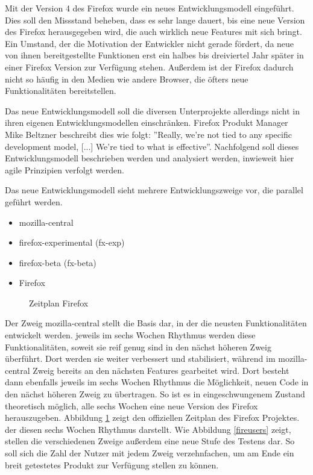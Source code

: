 Mit der Version 4 des Firefox wurde ein neues Entwicklungsmodell eingeführt. Dies soll den Missstand beheben, dass es sehr lange dauert, bis eine neue Version des Firefox herausgegeben wird, die auch wirklich neue Features mit sich bringt. Ein Umstand, der die Motivation der Entwickler nicht gerade fördert, da neue von ihnen bereitgestellte Funktionen erst ein halbes bis dreiviertel Jahr später in einer Firefox Version zur Verfügung stehen. Außerdem ist der Firefox dadurch nicht so häufig in den Medien wie andere Browser, die öfters neue Funktionalitäten bereitstellen.

Das neue Entwicklungsmodell soll die diversen Unterprojekte allerdings nicht in ihren eigenen Entwicklungsmodellen einschränken. Firefox Produkt Manager Mike Beltzner beschreibt dies wie folgt: ''Really, we're not tied to any specific development model, [...] We're tied to what is effective''\cite{bib:beltzner}. Nachfolgend soll dieses Entwicklungsmodell beschrieben werden und analysiert werden, inwieweit hier agile Prinzipien verfolgt werden.

Das neue Entwicklungsmodell sieht mehrere Entwicklungszweige vor, die pa\-ra\-llel geführt werden.
\begin{itemize}
\item mozilla-central
\item firefox-experimental (fx-exp)
\item firefox-beta (fx-beta)
\item Firefox
\end{itemize}
\begin{figure}[h]
	\centering
	\caption{Zeitplan Firefox\cite{bib:fire-development}}
	\label{firett}
\end{figure}

Der Zweig mozilla-central stellt die Basis dar, in der die neusten Funktionalitäten entwickelt werden. jeweils im sechs Wochen Rhythmus werden diese Funktionalitäten, soweit sie reif genug sind in den nächst höheren Zweig überführt. Dort werden sie weiter verbessert und stabilisiert, während im mozilla-central Zweig bereits an den nächsten Features gearbeitet wird. Dort besteht dann ebenfalls jeweils im sechs Wochen Rhythmus die Möglichkeit, neuen Code in den nächst höheren Zweig zu übertragen. So ist es in eingeschwungenem Zustand theoretisch möglich,  alle sechs Wochen eine neue Version des Firefox herauszugeben. Abbildung \ref{firett} zeigt den offiziellen Zeitplan des Firefox Projektes. der diesen sechs Wochen Rhythmus darstellt. Wie Abbildung \ref{fireusers} zeigt, stellen die verschiedenen Zweige außerdem eine neue Stufe des Testens dar. So soll sich die Zahl der Nutzer mit jedem Zweig verzehnfachen, um am Ende ein breit getestetes Produkt zur Verfügung stellen zu können.

